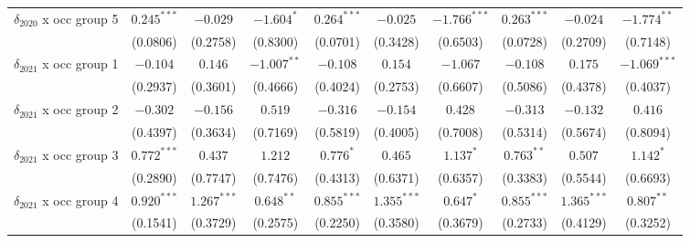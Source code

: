 \begin{tabular}{l|ccc|ccc|ccc}
$\delta_{2020}$ x occ group 5          &           $0.245^{***}$ &        $-0.029$ &      $-1.604^*$ &            $0.264^{***}$ &        $-0.025$ &  $-1.766^{***}$ &            $0.263^{***}$ &        $-0.024$ &   $-1.774^{**}$ \\
                                       &                (0.0806) &        (0.2758) &        (0.8300) &                 (0.0701) &        (0.3428) &        (0.6503) &                 (0.0728) &        (0.2709) &        (0.7148) \\
$\delta_{2021}$ x occ group 1          &                $-0.104$ &         $0.146$ &   $-1.007^{**}$ &                 $-0.108$ &         $0.154$ &        $-1.067$ &                 $-0.108$ &         $0.175$ &  $-1.069^{***}$ \\
                                       &                (0.2937) &        (0.3601) &        (0.4666) &                 (0.4024) &        (0.2753) &        (0.6607) &                 (0.5086) &        (0.4378) &        (0.4037) \\
$\delta_{2021}$ x occ group 2          &                $-0.302$ &        $-0.156$ &         $0.519$ &                 $-0.316$ &        $-0.154$ &         $0.428$ &                 $-0.313$ &        $-0.132$ &         $0.416$ \\
                                       &                (0.4397) &        (0.3634) &        (0.7169) &                 (0.5819) &        (0.4005) &        (0.7008) &                 (0.5314) &        (0.5674) &        (0.8094) \\
$\delta_{2021}$ x occ group 3          &           $0.772^{***}$ &         $0.437$ &         $1.212$ &                $0.776^*$ &         $0.465$ &       $1.137^*$ &             $0.763^{**}$ &         $0.507$ &       $1.142^*$ \\
                                       &                (0.2890) &        (0.7747) &        (0.7476) &                 (0.4313) &        (0.6371) &        (0.6357) &                 (0.3383) &        (0.5544) &        (0.6693) \\
$\delta_{2021}$ x occ group 4          &           $0.920^{***}$ &   $1.267^{***}$ &    $0.648^{**}$ &            $0.855^{***}$ &   $1.355^{***}$ &       $0.647^*$ &            $0.855^{***}$ &   $1.365^{***}$ &    $0.807^{**}$ \\
                                       &                (0.1541) &        (0.3729) &        (0.2575) &                 (0.2250) &        (0.3580) &        (0.3679) &                 (0.2733) &        (0.4129) &        (0.3252) \\

\end{tabular}
